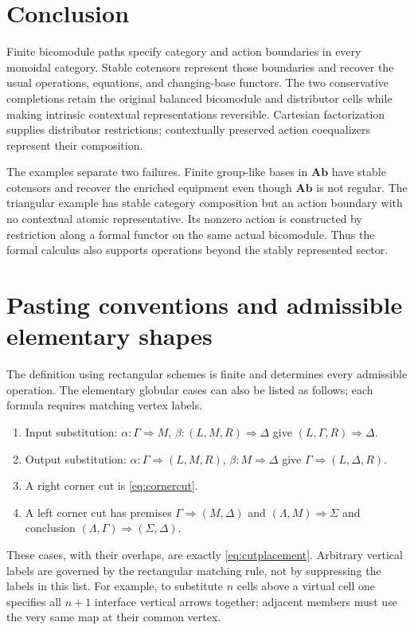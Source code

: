 \documentclass[11pt,reqno]{amsart}
\theoremstyle{plain}
\theoremstyle{definition}
\theoremstyle{remark}
\numberwithin{equation}{section}
\newcommand{\cell}{\mathrel{\Longrightarrow}}
\newcommand{\Ab}{\mathbf{Ab}}
\begin{document}
\section{Conclusion}\label{sec:conclusion}

Finite bicomodule paths specify category and action boundaries in every
monoidal category. Stable cotensors represent those boundaries and recover
the usual operations, equations, and changing-base functors. The two
conservative completions retain the original balanced bicomodule and
distributor cells while making intrinsic contextual representations
reversible. Cartesian factorization supplies distributor restrictions;
contextually preserved action coequalizers represent their composition.

The examples separate two failures. Finite group-like bases in $\Ab$
have stable cotensors and recover the enriched equipment even though
$\Ab$ is not regular. The triangular example has stable category
composition but an action boundary with no contextual atomic
representative. Its nonzero action is constructed by restriction along
a formal functor on the same actual bicomodule. Thus the formal calculus
also supports operations beyond the stably represented sector.

\appendix
\section{Pasting conventions and admissible elementary shapes}\label{app:shapes}

The definition using rectangular schemes is finite and determines every
admissible operation. The elementary globular cases can also be listed
as follows; each formula requires matching vertex labels.
\begin{enumerate}
\item Input substitution:
$\alpha:\Gamma\cell M$, $\beta:(L,M,R)\cell\Delta$ give
$(L,\Gamma,R)\cell\Delta$.
\item Output substitution:
$\alpha:\Gamma\cell(L,M,R)$, $\beta:M\cell\Delta$ give
$\Gamma\cell(L,\Delta,R)$.
\item A right corner cut is \cref{eq:cornercut}.
\item A left corner cut has premises
$\Gamma\cell(M,\Delta)$ and $(\Lambda,M)\cell\Sigma$ and
conclusion $(\Lambda,\Gamma)\cell(\Sigma,\Delta)$.
\end{enumerate}
These cases, with their overlaps, are exactly
\cref{eq:cutplacement}. Arbitrary vertical labels are governed by the
rectangular matching rule, not by suppressing the labels in this list.
For example, to substitute $n$ cells above a virtual cell one specifies
all $n+1$ interface vertical arrows together; adjacent members must use
the very same map at their common vertex.
\end{document}
